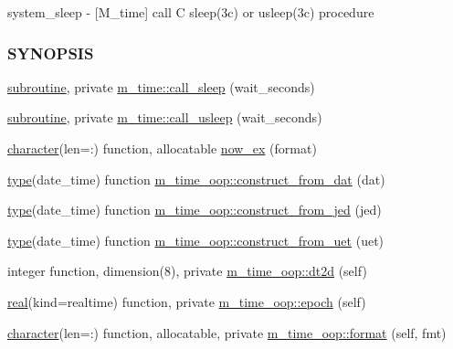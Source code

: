 \begin{DoxyCompactItemize}
\begin{DoxyCompactList}
system\+\_\+sleep -\/ \mbox{[}M\+\_\+time\mbox{]} call C sleep(3c) or usleep(3c) procedure \subsubsection*{S\+Y\+N\+O\+P\+S\+IS}\end{DoxyCompactList}\item 
\hyperlink{M__stopwatch_83_8txt_acfbcff50169d691ff02d4a123ed70482}{subroutine}, private \hyperlink{namespacem__time_af558bfc1fd5b13a6b879b3969866956f}{m\+\_\+time\+::call\+\_\+sleep} (wait\+\_\+seconds)
\item 
\hyperlink{M__stopwatch_83_8txt_acfbcff50169d691ff02d4a123ed70482}{subroutine}, private \hyperlink{namespacem__time_ae63783f7479d2f5093c8031d38ce4304}{m\+\_\+time\+::call\+\_\+usleep} (wait\+\_\+seconds)
\item 
\hyperlink{option__stopwatch_83_8txt_abd4b21fbbd175834027b5224bfe97e66}{character}(len=\+:) function, allocatable \hyperlink{M__time_8f90_a09223e2da0c23850fad035407582fd68}{now\+\_\+ex} (format)
\item 
\hyperlink{stop__watch_83_8txt_a70f0ead91c32e25323c03265aa302c1c}{type}(date\+\_\+time) function \hyperlink{namespacem__time__oop_ae43c4146d74863b5aee027ebc0103f48}{m\+\_\+time\+\_\+oop\+::construct\+\_\+from\+\_\+dat} (dat)
\item 
\hyperlink{stop__watch_83_8txt_a70f0ead91c32e25323c03265aa302c1c}{type}(date\+\_\+time) function \hyperlink{namespacem__time__oop_ac7d9aa1885c2b8df613541be8a147064}{m\+\_\+time\+\_\+oop\+::construct\+\_\+from\+\_\+jed} (jed)
\item 
\hyperlink{stop__watch_83_8txt_a70f0ead91c32e25323c03265aa302c1c}{type}(date\+\_\+time) function \hyperlink{namespacem__time__oop_ae952d7599526f1b2632452d00363add3}{m\+\_\+time\+\_\+oop\+::construct\+\_\+from\+\_\+uet} (uet)
\item 
integer function, dimension(8), private \hyperlink{namespacem__time__oop_ac68405e5566d5aec59cd1fba7145130c}{m\+\_\+time\+\_\+oop\+::dt2d} (self)
\item 
\hyperlink{read__watch_83_8txt_abdb62bde002f38ef75f810d3a905a823}{real}(kind=realtime) function, private \hyperlink{namespacem__time__oop_a50cb1ad3024b3b44b004382323bea7a9}{m\+\_\+time\+\_\+oop\+::epoch} (self)
\item 
\hyperlink{option__stopwatch_83_8txt_abd4b21fbbd175834027b5224bfe97e66}{character}(len=\+:) function, allocatable, private \hyperlink{namespacem__time__oop_a78bb598e3481faa48df9733a3f9ae060}{m\+\_\+time\+\_\+oop\+::format} (self, fmt)

\end{DoxyCompactItemize}

